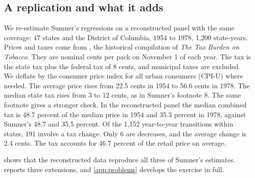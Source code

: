 \subsection{A replication and what it adds}\label{sec:03-sumner-replication}

We re-estimate Sumner's regressions on a reconstructed panel with the same coverage: 47 states and the District of
Columbia, 1954 to 1978, 1,200 state-years. Prices and taxes come from \citet[Table~13]{TobaccoInstitute1983}, the historical
compilation of \emph{The Tax Burden on Tobacco}. They are nominal cents per pack on November 1 of each year. The tax is the state tax plus the
federal tax of 8 cents, and municipal taxes are excluded. We deflate by the consumer price index for all urban consumers (CPI-U) where needed. The average price rises
from 22.5 cents in 1954 to 56.6 cents in 1978. The median state tax rises from 3 to 12 cents, as in Sumner's
footnote 8. The same footnote gives a stronger check. In the reconstructed panel the median combined tax is 48.7
percent of the median price in 1954 and 35.3 percent in 1978, against Sumner's 48.7 and 35.5 percent. Of the 1,152 year-to-year transitions within states, 191 involve a tax change. Only 6 are
decreases, and the average change is 2.4 cents. The tax accounts for 46.7 percent of the retail price on average.

 shows that the reconstructed data reproduce all three of Sumner's estimates. 
reports three extensions, and \cref{app:problems} develops the exercise in full.

